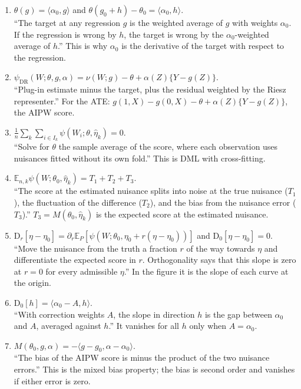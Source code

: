 \documentclass[11pt]{article}
\newcommand{\E}{\mathbb{E}}
\begin{document}
\begin{enumerate}[leftmargin=*,itemsep=4pt]
\item $\theta(g)=\langle\alpha_0,g\rangle$ and $\theta(g_0+h)-\theta_0=\langle\alpha_0,h\rangle$.\\
``The target at any regression $g$ is the weighted average of $g$ with weights $\alpha_0$. If the regression is wrong by $h$, the target is wrong by the $\alpha_0$-weighted average of $h$.'' This is why $\alpha_0$ is the derivative of the target with respect to the regression.

\item $\psi_{\mathrm{DR}}(W;\theta,g,\alpha)=\nu(W;g)-\theta+\alpha(Z)\{Y-g(Z)\}$.\\
``Plug-in estimate minus the target, plus the residual weighted by the Riesz representer.'' For the ATE: $g(1,X)-g(0,X)-\theta+\alpha(Z)\{Y-g(Z)\}$, the AIPW score.

\item $\frac1n\sum_k\sum_{i\in I_k}\psi(W_i;\theta,\hat\eta_k)=0$.\\
``Solve for $\theta$ the sample average of the score, where each observation uses nuisances fitted without its own fold.'' This is DML with cross-fitting.

\item $\E_{n,k}\psi(W;\theta_0,\hat\eta_k)=T_1+T_2+T_3$.\\
``The score at the estimated nuisance splits into noise at the true nuisance ($T_1$), the fluctuation of the difference ($T_2$), and the bias from the nuisance error ($T_3$).'' $T_3=M(\theta_0,\hat\eta_k)$ is the expected score at the estimated nuisance.

\item $\mathrm D_r[\eta-\eta_0]=\partial_r\E_P[\psi(W;\theta_0,\eta_0+r(\eta-\eta_0))]$ and $\mathrm D_0[\eta-\eta_0]=0$.\\
``Move the nuisance from the truth a fraction $r$ of the way towards $\eta$ and differentiate the expected score in $r$. Orthogonality says that this slope is zero at $r=0$ for every admissible $\eta$.'' In the figure it is the slope of each curve at the origin.

\item $\mathrm D_0[h]=\langle\alpha_0-A,h\rangle$.\\
``With correction weights $A$, the slope in direction $h$ is the gap between $\alpha_0$ and $A$, averaged against $h$.'' It vanishes for all $h$ only when $A=\alpha_0$.

\item $M(\theta_0,g,\alpha)=-\langle g-g_0,\alpha-\alpha_0\rangle$.\\
``The bias of the AIPW score is minus the product of the two nuisance errors.'' This is the mixed bias property; the bias is second order and vanishes if either error is zero.


\end{enumerate}
\end{document}
